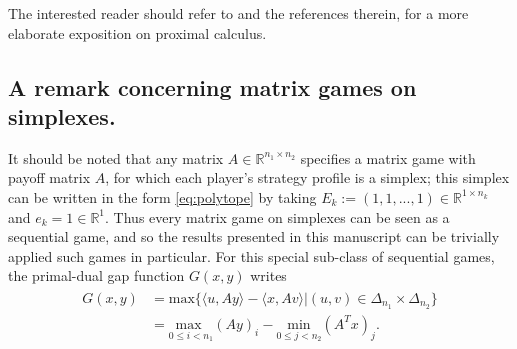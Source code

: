 \documentclass[a4paper,9pt]{extarticle}
\begin{document}
The interested reader should refer to \cite{combettes2011proximal} and
the references therein, for a more elaborate exposition on
proximal calculus. %

\subsection{A remark concerning matrix games on simplexes.} It should
be noted
that any matrix $A \in \mathbb{R}^{n_1 \times n_2}$ specifies a matrix
  game with payoff matrix $A$, for which each player's strategy
profile is a simplex; this simplex can be written in the form
\eqref{eq:polytope} by taking $E_k := (1, 1, ..., 1) \in
\mathbb{R}^{1 \times n_k}$ and $e_k = 1 \in \mathbb{R}^1$. Thus every
matrix game on simplexes can be seen as a sequential game, and so the
results presented in this manuscript can be trivially applied such
games in particular. For this special sub-class of sequential games,
the primal-dual gap function $G(x,y)$ writes
\begin{eqnarray}
\begin{split}
G(x, y) &=
\mathrm{max}\{\langle u, Ay\rangle - \langle x, Av\rangle | (u,v) \in
\Delta_{n_1} \times \Delta_{n_2}\}\\
&= \underset{0 \le i <
  n_1}{\text{max }}(Ay)_i - \underset{0 \le j < n_2}{\text{min
}}(A^Tx)_j.
\end{split}
\label{eq:mg_pd}
\end{eqnarray}
\end{document}
